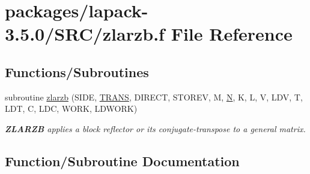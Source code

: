 \hypertarget{zlarzb_8f}{}\section{packages/lapack-\/3.5.0/\+S\+R\+C/zlarzb.f File Reference}
\label{zlarzb_8f}
\subsection*{Functions/\+Subroutines}
\begin{DoxyCompactItemize}
\item 
subroutine \hyperlink{zlarzb_8f_a0eaf97ddc4b598206ea7d0297d3360f3}{zlarzb} (S\+I\+D\+E, \hyperlink{superlu__enum__consts_8h_a0c4e17b2d5cea33f9991ccc6a6678d62a1f61e3015bfe0f0c2c3fda4c5a0cdf58}{T\+R\+A\+N\+S}, D\+I\+R\+E\+C\+T, S\+T\+O\+R\+E\+V, M, \hyperlink{polmisc_8c_a0240ac851181b84ac374872dc5434ee4}{N}, K, L, V, L\+D\+V, T, L\+D\+T, C, L\+D\+C, W\+O\+R\+K, L\+D\+W\+O\+R\+K)
\begin{DoxyCompactList}\small\item\em {\bfseries Z\+L\+A\+R\+Z\+B} applies a block reflector or its conjugate-\/transpose to a general matrix. \end{DoxyCompactList}\end{DoxyCompactItemize}


\subsection{Function/\+Subroutine Documentation}
\hypertarget{zlarzb_8f_a0eaf97ddc4b598206ea7d0297d3360f3}{}
